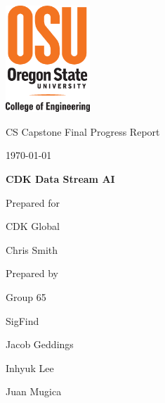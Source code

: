 \documentclass[article, onecolumn, draftclsnofoot,10pt, compsoc]{IEEEtran}
\def \CapstoneTeamName{		SigFind}
\def \CapstoneTeamNumber{		65}
\def \GroupMemberOne{			Jacob Geddings}
\def \GroupMemberTwo{			Inhyuk Lee}
\def \GroupMemberThree{			Juan Mugica}
\def \CapstoneProjectName{		CDK Data Stream AI}
\def \CapstoneSponsorCompany{	CDK Global}
\def \CapstoneSponsorPerson{		Chris Smith}
\def \DocType{		%
				Final Progress Report
				}
\begin{document}
\begin{titlepage}
    \begin{singlespace}
    	\includegraphics[height=4cm]{coe_v_spot1}
        \hfill 
        \par\vspace{.2in}
        \centering
        \scshape{
            \huge CS Capstone \DocType \par
            {\large\today}\par
            \vspace{.5in}
            \textbf{\Huge\CapstoneProjectName}\par
            \vfill
            {\large Prepared for}\par
            \Huge \CapstoneSponsorCompany\par
            \vspace{5pt}
            {\Large\CapstoneSponsorPerson\par}
            {\large Prepared by }\par
            Group\CapstoneTeamNumber\par
            \CapstoneTeamName\par 
            \vspace{5pt}
            {\Large
                \GroupMemberOne\par
                \GroupMemberTwo\par
               \GroupMemberThree\par
            }
            \vspace{20pt}
        }
        \begin{abstract}
		
        \end{abstract}     
    \end{singlespace}
\end{titlepage}
\newpage
{}
\tableofcontents
\clearpage
\end{document}
